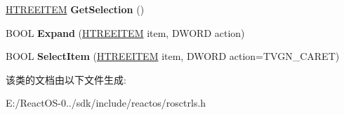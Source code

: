 \begin{DoxyCompactItemize}
\item 
\mbox{\label{class_c_tree_view_ae5252a3ece8ccbe520cae37ba594a473}} 
\hyperlink{struct___t_r_e_e_i_t_e_m}{H\+T\+R\+E\+E\+I\+T\+EM} {\bfseries Get\+Selection} ()
\item 
\mbox{\label{class_c_tree_view_a03baada8b7589bcfaf70f623f2b8e176}} 
B\+O\+OL {\bfseries Expand} (\hyperlink{struct___t_r_e_e_i_t_e_m}{H\+T\+R\+E\+E\+I\+T\+EM} item, D\+W\+O\+RD action)
\item 
\mbox{\label{class_c_tree_view_a90353c16b9d395013c8e1fe4899e3a9a}} 
B\+O\+OL {\bfseries Select\+Item} (\hyperlink{struct___t_r_e_e_i_t_e_m}{H\+T\+R\+E\+E\+I\+T\+EM} item, D\+W\+O\+RD action=T\+V\+G\+N\+\_\+\+C\+A\+R\+ET)
\end{DoxyCompactItemize}


该类的文档由以下文件生成\+:\begin{DoxyCompactItemize}
\item 
E\+:/\+React\+O\+S-\/0../sdk/include/reactos/rosctrls.\+h\end{DoxyCompactItemize}
